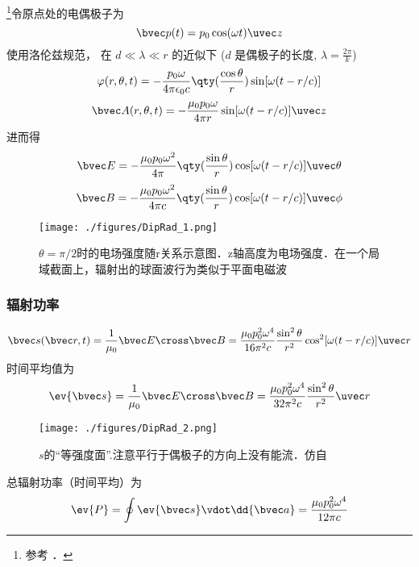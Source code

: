 
\begin{issues}
\issueDraft
\end{issues}


\footnote{参考 \cite{GriffE}．}令原点处的电偶极子为
\begin{equation}
\bvec p(t) = p_0 \cos(\omega t) \uvec z
\end{equation}
使用洛伦兹规范， 在 $d \ll \lambda \ll r$ 的近似下 ($d$ 是偶极子的长度, $\lambda = \frac{2\pi}{k}$)
\begin{equation}
\varphi(r, \theta, t) = -\frac{p_0\omega}{4\pi\epsilon_0 c} \qty(\frac{\cos\theta}{r}) \sin[\omega(t - r/c)]
\end{equation}
\begin{equation}
\bvec A(r, \theta, t) = -\frac{\mu_0 p_0 \omega}{4\pi r} \sin[\omega(t - r/c)]\uvec z
\end{equation}
进而得
\begin{equation}
\bvec E = -\frac{\mu_0 p_0\omega^2}{4\pi} \qty(\frac{\sin\theta}{r})\cos[\omega(t - r/c)]\uvec \theta
\end{equation}
\begin{equation}
\bvec B = -\frac{\mu_0 p_0\omega^2}{4\pi c} \qty(\frac{\sin\theta}{r})\cos[\omega(t - r/c)]\uvec \phi
\end{equation}

\begin{figure}[ht]
\centering
\texttt{[image: ./figures/DipRad\_1.png]}
\caption{$\theta = \pi/2$时的电场强度随r关系示意图．z轴高度为电场强度．在一个局域截面上，辐射出的球面波行为类似于平面电磁波} \label{DipRad_fig1}
\end{figure}

\subsubsection{辐射功率}
\begin{equation}
\bvec s(\bvec r, t) = \frac{1}{\mu_0} \bvec E \cross \bvec B = \frac{\mu_0p_0^2\omega^4}{16\pi^2c} \frac{\sin^2\theta}{r^2} \cos^2[\omega(t - r/c)] \uvec r
\end{equation}
时间平均值为
\begin{equation}
\ev{\bvec s} = \frac{1}{\mu_0} \bvec E \cross \bvec B
= \frac{\mu_0p_0^2\omega^4}{32\pi^2c} \frac{\sin^2\theta}{r^2} \uvec r
\end{equation}

\begin{figure}[ht]
\centering
\texttt{[image: ./figures/DipRad\_2.png]}
\caption{$s$的“等强度面”.注意平行于偶极子的方向上没有能流．仿自\cite{GriffE}} \label{DipRad_fig2}
\end{figure}
总辐射功率（时间平均）为
\begin{equation}
\ev{P} = \oint \ev{\bvec s} \vdot \dd{\bvec a} = \frac{\mu_0 p_0^2 \omega^4}{12\pi c}
\end{equation}
